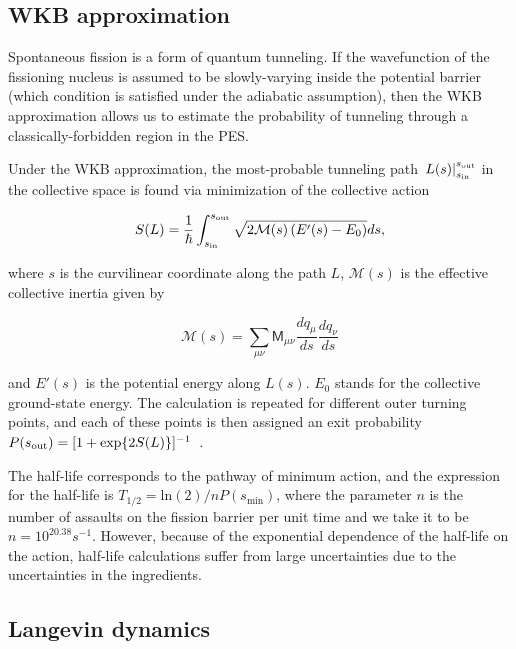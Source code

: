\subsection{WKB approximation}\label{sect:wkb}
Spontaneous fission is a form of quantum tunneling. If the wavefunction of the fissioning nucleus is assumed to be slowly-varying inside the potential barrier (which condition is satisfied under the adiabatic assumption), then the WKB approximation allows us to estimate the probability of tunneling through a classically-forbidden region in the PES.

Under the WKB approximation, the most-probable tunneling path $\left. L(s) \right|_{s_{\rm in}}^{s_{\rm out}}$ in the collective space is found via minimization of the collective action

\begin{equation}\label{eq:action} 
S(L) = \frac{1}{\hbar}\int_{s_{\rm in}}^{s_{\rm out}} \sqrt{2\mathcal{M}(s)\left(E'(s)-E_0\right)}ds,
\end{equation} 

\noindent where $s$ is the curvilinear coordinate along the path $L$, $\mathcal{M}(s)$ is the effective collective inertia given by~\cite{Sadhukhan2013}

\begin{equation}
\mathcal{M}(s) = \sum_{\mu\nu} \mathsf{M}_{\mu\nu} \frac{dq_\mu}{ds} \frac{dq_\nu}{ds}
\end{equation}

\noindent and $E'(s)$ is the potential energy along $L(s)$. $E_0$ stands for the collective ground-state energy. The calculation is repeated for different outer turning points, and each of these points is then assigned an exit probability $P(s_{\rm out})=[1+\exp{2S(L)}]^{-1}$~\cite{Baran1978}. 

The half-life corresponds to the pathway of minimum action, and the expression for the half-life is $T_{1/2} = \mathrm{ln}(2)/nP(s_\mathrm{min})$, where the parameter $n$ is the number of assaults on the fission barrier per unit time and we take it to be $n=10^{20.38} s^{-1}$. However, because of the exponential dependence of the half-life on the action, half-life calculations suffer from large uncertainties due to the uncertainties in the ingredients.

\subsection{Langevin dynamics}

